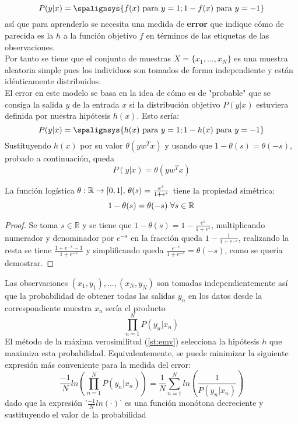 \[P(y \vert x)=\spalignsys{
f(x) \textnormal{      para }  y=1;
1-f(x) \textnormal{   para }  y=-1}\]
así que para aprenderlo se necesita una medida de \textbf{error} que indique cómo de parecida es la $h$ a la función objetivo $f$ en términos de las etiquetas de las observaciones.\cite{abu2012learning}\\
Por tanto se tiene que el conjunto de muestras $X=\lbrace x_{1},...,x_{N} \rbrace$ es una muestra aleatoria simple pues los individuos son tomados de forma independiente y están idénticamente distribuidos.\\
El error en este modelo se basa en la idea de cómo es de "probable" que se consiga la salida $y$ de la entrada $x$ si la distribución objetivo $P(y \vert x)$ estuviera definida por nuestra hipótesis $h(x)$. Esto sería:
\[P(y \vert x)=\spalignsys{
h(x) \textnormal{      para }  y=1;
1-h(x) \textnormal{   para }  y=-1}\]
Sustituyendo $h(x)$ por su valor $\theta(yw^{T}x)$ y usando que $1-\theta(s)=\theta(-s)$, probado a continuación, queda \[ P(y \vert x)=\theta(yw^{T}x) \]
\begin{proposicion}La función logística $\theta: \mathbb{R} \rightarrow [0,1] \textnormal{, } \theta(s)=\frac{e^{s}}{1+e^{s}}$ tiene la propiedad simétrica: \[1-\theta(s)=\theta(-s) \textnormal{ } \forall s \in \mathbb{R} \]
\end{proposicion}
\begin{proof}
Se toma $s \in \mathbb{R}$ y se tiene que $1-\theta(s)=1-\frac{e^{s}}{1+e^{s}}$, multiplicando numerador y denominador por $e^{-s}$ en la fracción queda $1-\frac{1}{1+e^{-s}}$, realizando la resta se tiene $\frac{1+e^{-s}-1}{1+e^{-s}}$ y simplificando queda $\frac{e^{-s}}{1+e^{-s}}=\theta(-s)$, como se quería demostrar.
\end{proof}
Las observaciones $(x_{1},y_{1}),...,(x_{N},y_{N})$ son tomadas independientemente así que la probabilidad de obtener todas las salidas $y_{n}$ en los datos desde la correspondiente muestra $x_{n}$ sería el producto \[ \prod_{n=1}^{N}P(y_{n} \vert x_{n}) \]
El método de la máxima verosimilitud (\autoref{st:emv}) selecciona la hipótesis $h$ que maximiza esta probabilidad. Equivalentemente, se puede minimizar la siguiente expresión más conveniente para la medida del error:
\[ \frac{-1}{N}ln \left(\prod_{n=1}^{N}P(y_{n} \vert x_{n})\right) = \frac{1}{N}\sum_{n=1}^{N}ln \left(\frac{1}{P(y_{n} \vert x_{n})} \right) \]
dado que la expresión '$\frac{-1}{N}ln(\cdot)$' es una función monótona decreciente y sustituyendo el valor de la probabilidad

\endinput











